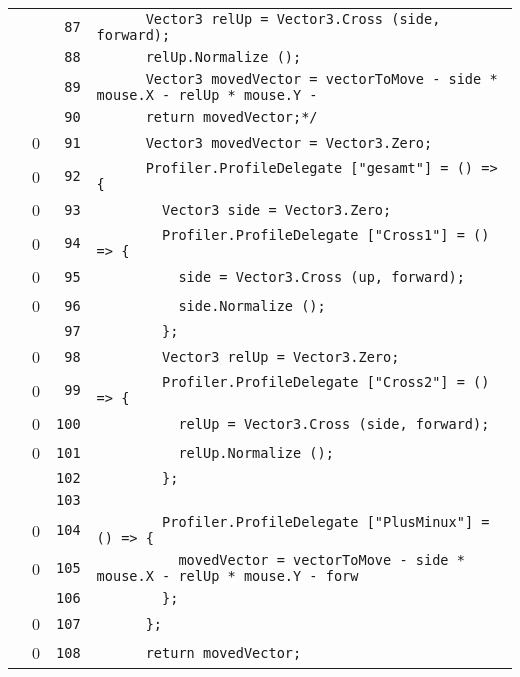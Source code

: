 \documentclass[a4paper,10pt]{article}
\begin{document}
\begin{longtable}[l]{lrrl}
\cellcolor{gray} &  & \verb~87~ & \verb~      Vector3 relUp = Vector3.Cross (side, forward);~\\
\cellcolor{gray} &  & \verb~88~ & \verb~      relUp.Normalize ();~\\
\cellcolor{gray} &  & \verb~89~ & \verb~      Vector3 movedVector = vectorToMove - side * mouse.X - relUp * mouse.Y - ~\\
\cellcolor{gray} &  & \verb~90~ & \verb~      return movedVector;*/~\\
\cellcolor{red} & 0 & \verb~91~ & \verb~      Vector3 movedVector = Vector3.Zero;~\\
\cellcolor{red} & 0 & \verb~92~ & \verb~      Profiler.ProfileDelegate ["gesamt"] = () => {~\\
\cellcolor{red} & 0 & \verb~93~ & \verb~        Vector3 side = Vector3.Zero;~\\
\cellcolor{red} & 0 & \verb~94~ & \verb~        Profiler.ProfileDelegate ["Cross1"] = () => {~\\
\cellcolor{red} & 0 & \verb~95~ & \verb~          side = Vector3.Cross (up, forward);~\\
\cellcolor{red} & 0 & \verb~96~ & \verb~          side.Normalize ();~\\
\cellcolor{gray} &  & \verb~97~ & \verb~        };~\\
\cellcolor{red} & 0 & \verb~98~ & \verb~        Vector3 relUp = Vector3.Zero;~\\
\cellcolor{red} & 0 & \verb~99~ & \verb~        Profiler.ProfileDelegate ["Cross2"] = () => {~\\
\cellcolor{red} & 0 & \verb~100~ & \verb~          relUp = Vector3.Cross (side, forward);~\\
\cellcolor{red} & 0 & \verb~101~ & \verb~          relUp.Normalize ();~\\
\cellcolor{gray} &  & \verb~102~ & \verb~        };~\\
\cellcolor{gray} &  & \verb~103~ & \verb~~\\
\cellcolor{red} & 0 & \verb~104~ & \verb~        Profiler.ProfileDelegate ["PlusMinux"] = () => {~\\
\cellcolor{red} & 0 & \verb~105~ & \verb~          movedVector = vectorToMove - side * mouse.X - relUp * mouse.Y - forw~\\
\cellcolor{gray} &  & \verb~106~ & \verb~        };~\\
\cellcolor{red} & 0 & \verb~107~ & \verb~      };~\\
\cellcolor{red} & 0 & \verb~108~ & \verb~      return movedVector;~\\

\end{longtable}
\end{document}
